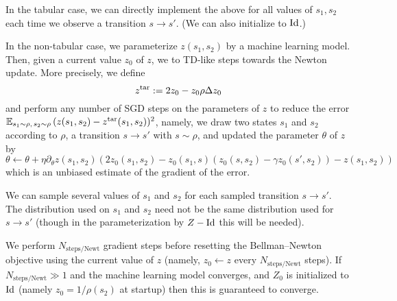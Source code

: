 \documentclass[11pt,a4paper]{article}
\newcommand{\ztar}{z^\mathrm{tar}}
\newcommand{\Nnewt}{N_\mathrm{steps/Newt}}
\begin{document}
In the tabular case, we can directly implement the above for all values
of $s_1,s_2$ each time we observe a transition $s\to s'$. (We can also
initialize to $\operatorname{Id}$.)

In the non-tabular case, we parameterize $z(s_1,s_2)$ by a machine
learning model. Then, given a current value $z_0$ of $z$, we to TD-like
steps towards the Newton update. More precisely, we define
\begin{equation}
\ztar\deq 2z_0-z_0\rho\Delta z_0
\end{equation}
and perform any number of SGD steps on the parameters of $z$ to reduce
the error $\E_{s_1\sim \rho,\,s_2\sim \rho}
\,(z(s_1,s_2)-\ztar(s_1,s_2))^2$, namely, we draw two states $s_1$ and
$s_2$ according to $\rho$, a transition $s\to s'$ with $s\sim \rho$, and
updated the parameter $\theta$ of $z$
by
\begin{equation}
\theta\gets \theta+\eta \partial_\theta z(s_1,s_2)\left(
2z_0(s_1,s_2)-z_0(s_1,s)\left(z_0(s,s_2)-\gamma z_0(s',s_2)\right)-z(s_1,s_2)
\right)
\end{equation}
which is an unbiased estimate of the gradient of the error.

We can sample several values of $s_1$ and $s_2$ for each sampled
transition $s\to s'$.  The distribution used on $s_1$ and $s_2$ need not
be the same distribution used for $s\to s'$ (though in the
parameterization by $Z-\operatorname{Id}$ this will be needed).

We perform $\Nnewt$ gradient steps before resetting the Bellman--Newton
objective using the current value of $z$ (namely, $z_0\gets z$ every
$\Nnewt$ steps). If $\Nnewt\gg 1$ and the machine learning model
converges, and $Z_0$ is initialized to $\operatorname{Id}$ (namely $z_0=1/\rho(s_2)$ at
startup) then this is guaranteed to converge.
\end{document}
